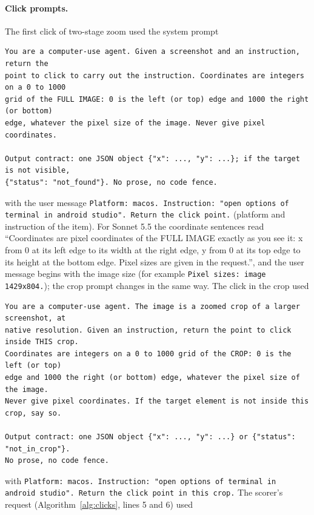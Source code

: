 \paragraph{Click prompts.} The first click of two-stage zoom used the system prompt

{\footnotesize
\begin{verbatim}
You are a computer-use agent. Given a screenshot and an instruction, return the
point to click to carry out the instruction. Coordinates are integers on a 0 to 1000
grid of the FULL IMAGE: 0 is the left (or top) edge and 1000 the right (or bottom)
edge, whatever the pixel size of the image. Never give pixel coordinates.

Output contract: one JSON object {"x": ..., "y": ...}; if the target is not visible,
{"status": "not_found"}. No prose, no code fence.
\end{verbatim}
}

\noindent with the user message \texttt{Platform: macos. Instruction: "open options of terminal in android studio". Return the click point.} (platform and instruction of the item). For Sonnet 5.5 the coordinate sentences read ``Coordinates are pixel coordinates of the FULL IMAGE exactly as you see it: x from 0 at its left edge to its width at the right edge, y from 0 at its top edge to its height at the bottom edge. Pixel sizes are given in the request.'', and the user message begins with the image size (for example \texttt{Pixel sizes: image 1429x804.}); the crop prompt changes in the same way. The click in the crop used

{\footnotesize
\begin{verbatim}
You are a computer-use agent. The image is a zoomed crop of a larger screenshot, at
native resolution. Given an instruction, return the point to click inside THIS crop.
Coordinates are integers on a 0 to 1000 grid of the CROP: 0 is the left (or top)
edge and 1000 the right (or bottom) edge, whatever the pixel size of the image.
Never give pixel coordinates. If the target element is not inside this crop, say so.

Output contract: one JSON object {"x": ..., "y": ...} or {"status": "not_in_crop"}.
No prose, no code fence.
\end{verbatim}
}

\noindent with \texttt{Platform: macos. Instruction: "open options of terminal in android studio". Return the click point in this crop.} The scorer's request (Algorithm~\ref{alg:clicks}, lines 5 and 6) used

